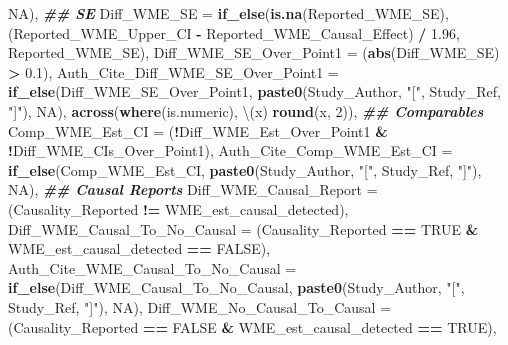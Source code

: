\documentclass[
]{article}
\newenvironment{Shaded}{\begin{snugshade}}{\end{snugshade}}
\newcommand{\AttributeTok}[1]{\textcolor[rgb]{0.13,0.29,0.53}{#1}}
\newcommand{\ConstantTok}[1]{\textcolor[rgb]{0.56,0.35,0.01}{#1}}
\newcommand{\DecValTok}[1]{\textcolor[rgb]{0.00,0.00,0.81}{#1}}
\newcommand{\DocumentationTok}[1]{\textcolor[rgb]{0.56,0.35,0.01}{\textbf{\textit{#1}}}}
\newcommand{\FloatTok}[1]{\textcolor[rgb]{0.00,0.00,0.81}{#1}}
\newcommand{\FunctionTok}[1]{\textcolor[rgb]{0.13,0.29,0.53}{\textbf{#1}}}
\newcommand{\NormalTok}[1]{#1}
\newcommand{\SpecialCharTok}[1]{\textcolor[rgb]{0.81,0.36,0.00}{\textbf{#1}}}
\newcommand{\StringTok}[1]{\textcolor[rgb]{0.31,0.60,0.02}{#1}}
\begin{document}
\begin{Shaded}
\begin{Highlighting}[]
                                             \ConstantTok{NA}\NormalTok{),}
    \DocumentationTok{\#\# SE}
    \AttributeTok{Diff\_WME\_SE =} \FunctionTok{if\_else}\NormalTok{(}\FunctionTok{is.na}\NormalTok{(Reported\_WME\_SE),}
\NormalTok{                          (Reported\_WME\_Upper\_CI }\SpecialCharTok{{-}}\NormalTok{ Reported\_WME\_Causal\_Effect) }\SpecialCharTok{/} \FloatTok{1.96}\NormalTok{,}
\NormalTok{                          Reported\_WME\_SE),}
    \AttributeTok{Diff\_WME\_SE\_Over\_Point1 =}\NormalTok{ (}\FunctionTok{abs}\NormalTok{(Diff\_WME\_SE) }\SpecialCharTok{\textgreater{}} \FloatTok{0.1}\NormalTok{),}
    \AttributeTok{Auth\_Cite\_Diff\_WME\_SE\_Over\_Point1 =} \FunctionTok{if\_else}\NormalTok{(Diff\_WME\_SE\_Over\_Point1,}
                                                \FunctionTok{paste0}\NormalTok{(Study\_Author, }\StringTok{"["}\NormalTok{, Study\_Ref, }\StringTok{"]"}\NormalTok{),}
                                                \ConstantTok{NA}\NormalTok{),}
    \FunctionTok{across}\NormalTok{(}\FunctionTok{where}\NormalTok{(is.numeric), \textbackslash{}(x) }\FunctionTok{round}\NormalTok{(x, }\DecValTok{2}\NormalTok{)),}
    \DocumentationTok{\#\# Comparables}
    \AttributeTok{Comp\_WME\_Est\_CI =}\NormalTok{ (}\SpecialCharTok{!}\NormalTok{Diff\_WME\_Est\_Over\_Point1 }\SpecialCharTok{\&} \SpecialCharTok{!}\NormalTok{Diff\_WME\_CIs\_Over\_Point1),}
    \AttributeTok{Auth\_Cite\_Comp\_WME\_Est\_CI =} \FunctionTok{if\_else}\NormalTok{(Comp\_WME\_Est\_CI,}
                                        \FunctionTok{paste0}\NormalTok{(Study\_Author, }\StringTok{"["}\NormalTok{, Study\_Ref, }\StringTok{"]"}\NormalTok{),}
                                        \ConstantTok{NA}\NormalTok{),}
    \DocumentationTok{\#\# Causal Reports}
    \AttributeTok{Diff\_WME\_Causal\_Report =}\NormalTok{ (Causality\_Reported }\SpecialCharTok{!=}\NormalTok{ WME\_est\_causal\_detected),}
    \AttributeTok{Diff\_WME\_Causal\_To\_No\_Causal =}\NormalTok{ (Causality\_Reported }\SpecialCharTok{==} \ConstantTok{TRUE} \SpecialCharTok{\&}\NormalTok{ WME\_est\_causal\_detected }\SpecialCharTok{==} \ConstantTok{FALSE}\NormalTok{),}
    \AttributeTok{Auth\_Cite\_WME\_Causal\_To\_No\_Causal =} \FunctionTok{if\_else}\NormalTok{(Diff\_WME\_Causal\_To\_No\_Causal,}
                                                \FunctionTok{paste0}\NormalTok{(Study\_Author, }\StringTok{"["}\NormalTok{, Study\_Ref, }\StringTok{"]"}\NormalTok{),}
                                                \ConstantTok{NA}\NormalTok{),}
    \AttributeTok{Diff\_WME\_No\_Causal\_To\_Causal =}\NormalTok{ (Causality\_Reported }\SpecialCharTok{==} \ConstantTok{FALSE} \SpecialCharTok{\&}\NormalTok{ WME\_est\_causal\_detected }\SpecialCharTok{==} \ConstantTok{TRUE}\NormalTok{),}

\end{Highlighting}
\end{Shaded}
\end{document}
